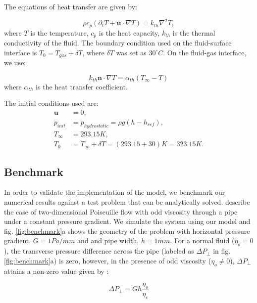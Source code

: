 \documentclass[%
 amsmath,amssymb,
 aps,
10.5pt]{revtex4-2}
\begin{document}
{The equations of heat transfer are given by:

\begin{equation}
    \rho c_p (\partial_t T + \boldsymbol{u}\cdot \nabla T) = k_{th} \nabla^2 T, 
\end{equation}
where $T$ is the temperature, $c_p$ is the heat capacity, $k_{th}$ is the thermal conductivity of the fluid. The boundary condition used on the fluid-surface interface is $T_0 = T_{gas} + \delta T$, where $\delta T$ was set as $30^\circ C$. On the fluid-gas interface, we use:

\begin{equation}
    k_{th} \boldsymbol{n}\cdot\nabla T = \alpha_{th} (T_\infty - T)
\end{equation}
where $\alpha_{th}$ is the heat transfer coefficient.

The initial conditions used are:
\begin{align}
    \boldsymbol{u} &= 0,  \nonumber\\ 
    p_{init} &= p_{hydrostatic} = \rho g (h-h_{ref}),  \nonumber\\ 
    T_{\infty} &= 293.15K,  \nonumber\\
    T_0 &= T_\infty +\delta T = (293.15 + 30) K = 323.15 K. \nonumber
\end{align}
}




\subsection{Benchmark}
In order to validate the implementation of the model, we benchmark our numerical results against a test problem that can be analytically solved. \cite{vitelli2022} describe the case of two-dimensional Poiseuille flow with odd viscosity through a pipe under a constant pressure gradient. We simulate the system using our model and fig. \ref{fig:benchmark}a shows the geometry of the problem with horizontal pressure gradient, $G = 1 Pa/mm$ and and pipe width, $h = 1 mm$. For a normal fluid ($\eta_o = 0$), the transverse pressure difference across the pipe (labeled as $\Delta P_\perp$ in fig. \ref{fig:benchmark}a) is zero, however, in the presence of odd viscosity ($\eta_o \neq 0$), $\Delta P_\perp$ attains a non-zero value given by \cite{vitelli2022}: 

\begin{equation} \label{eq:benchmark}
    \Delta P_{\perp} = Gh \frac{\eta_o}{\eta_e}
\end{equation} 
\end{document}

